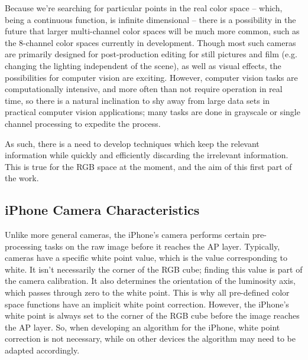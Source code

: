 Because we're searching for particular points in the real color space -- which, being a continuous function, is infinite dimensional -- there is a possibility in the future that larger multi-channel color spaces will be much more common, such as the 8-channel color spaces currently in development. Though most such cameras are primarily designed for post-production editing for still pictures and film (e.g. changing the lighting independent of the scene), as well as visual effects, the possibilities for computer vision are exciting. However, computer vision tasks are computationally intensive, and more often than not require operation in real time, so there is a natural inclination to shy away from large data sets in practical computer vision applications; many tasks are done in grayscale or single channel processing to expedite the process.

As such, there is a need to develop techniques which keep the relevant information while quickly and efficiently discarding the irrelevant information. This is true for the RGB space at the moment, and the aim of this first part of the work.

\subsection{iPhone Camera Characteristics} \label{sec:iPhoneCameraCharacteristics}

Unlike more general cameras, the iPhone's camera performs certain pre-processing tasks on the raw image before it reaches the AP layer. Typically, cameras have a specific white point value, which is the value corresponding to white. It isn't necessarily the corner of the RGB cube; finding this value is part of the camera calibration. It also determines the orientation of the luminosity axis, which passes through zero to the white point. This is why all pre-defined color space functions have an implicit white point correction. However, the iPhone's white point is always set to the corner of the RGB cube before the image reaches the AP layer. So, when developing an algorithm for the iPhone, white point correction is not necessary, while on other devices the algorithm may need to be adapted accordingly.

